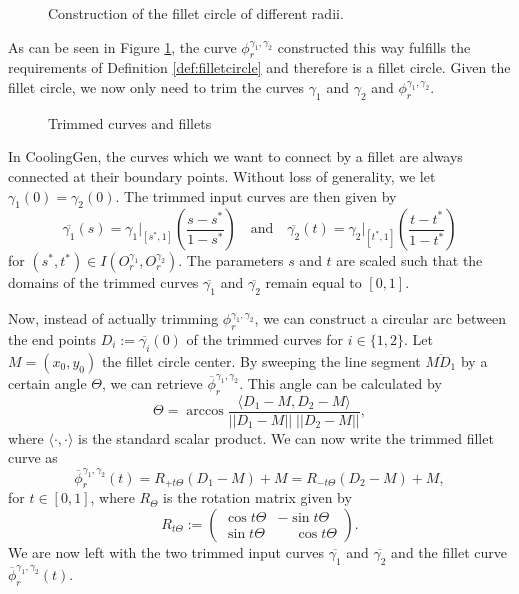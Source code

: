 \documentclass[a4paper, 11pt]{report}
\theoremstyle{definition}
\newcommand{\domrestr}{\big|}
\begin{document}
	\begin{figure}[H]
		\centering
		
		\caption{Construction of the fillet circle of different radii.}
		\label{fig:filletconstruction}
	\end{figure}

	As can be seen in Figure \ref{fig:filletconstruction}, the curve $\phi^{\gamma_1, \gamma_2}_r$ constructed this way fulfills the requirements of Definition \ref{def:filletcircle} and therefore is a fillet circle. Given the fillet circle, we now only need to trim the curves $\gamma_1$ and $\gamma_2$ and $\phi^{\gamma_1, \gamma_2}_r$.

	\begin{figure}[H]
		\centering
		
		\caption{Trimmed curves and fillets}
	\end{figure}

	In CoolingGen, the curves which we want to connect by a fillet are always connected at their boundary points. Without loss of generality, we let $\gamma_1(0) = \gamma_2(0)$. The trimmed input curves are then given by
		$$
			\overline{\gamma_1}(s) = \gamma_1 \domrestr_{[s^*,1]}\left(\frac{s-s^*}{1-s^*}\right) 
			\quad\text{and}\quad
			\overline{\gamma_2}(t) = \gamma_2 \domrestr_{[t^*,1]}\left(\frac{t-t^*}{1-t^*}\right) 
		$$
	for $(s^*,t^*) \in I(O^{\gamma_1}_r, O^{\gamma_2}_r)$. The parameters $s$ and $t$ are scaled such that the domains of the trimmed curves $\overline{\gamma_1}$ and $\overline{\gamma_2}$ remain equal to $[0,1]$.

	Now, instead of actually trimming $\phi^{\gamma_1, \gamma_2}_r$, we can construct a circular arc between the end points $D_i := \overline{\gamma_i}(0)$ of the trimmed curves for $i \in \{1,2\}$. Let $M = (x_0, y_0)$ the fillet circle center. By sweeping the line segment $\overline{M D_1}$ by a certain angle $\Theta$, we can retrieve $\overline{\phi}^{\gamma_1, \gamma_2}_r$. This angle can be calculated by
		$$ \Theta = \arccos \frac{\langle D_1-M, D_2-M \rangle}{||D_1-M|| \; ||D_2-M||}, $$
	where $\langle \cdot, \cdot \rangle$ is the standard scalar product. We can now write the trimmed fillet curve as
		$$ \overline{\phi}^{\gamma_1, \gamma_2}_r(t) = R_{+t\Theta}(D_1-M)+M = R_{-t\Theta}(D_2-M)+M,$$
	for $t \in [0,1]$, where $R_{\Theta}$ is the rotation matrix given by
		\begin{equation}
			R_{t\Theta} :=
			\begin{pmatrix}
				\cos t\Theta & -\sin t\Theta \\
				\sin t\Theta & \phantom{+}\cos t\Theta
			\end{pmatrix}.
			\label{eq:rotationmat}
		\end{equation}
	We are now left with the two trimmed input curves $\overline{\gamma_1}$ and $\overline{\gamma_2}$ and the fillet curve $\overline{\phi}^{\gamma_1, \gamma_2}_r(t)$.
\end{document}
